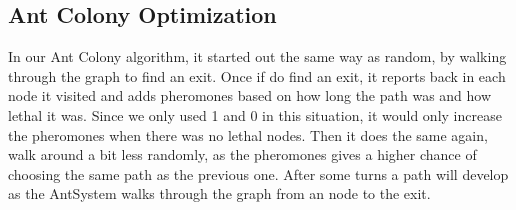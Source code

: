 \subsection{Ant Colony Optimization}
In our Ant Colony algorithm, it started out the same way as random, by walking through the graph to find an exit. Once if do find an exit, it reports back in each node it visited and adds pheromones based on how long the path was and how lethal it was. Since we only used 1 and 0 in this situation, it would only increase the pheromones when there was no lethal nodes. Then it does the same again, walk around a bit less randomly, as the pheromones gives a higher chance of choosing the same path as the previous one. After some turns a path will develop as the AntSystem walks through the graph from an node to the exit.












